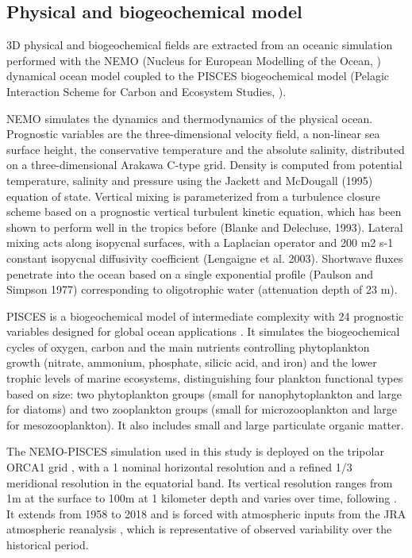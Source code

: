 \subsection{Physical and biogeochemical model}
\label{sec:nemo}

3D physical and biogeochemical fields are extracted from an oceanic simulation performed with the NEMO (Nucleus for European Modelling of the Ocean, \citealp{madecNEMOOceanEngine2019}) dynamical ocean model coupled to the PISCES biogeochemical model (Pelagic Interaction Scheme for Carbon and Ecosystem Studies, \citealp{aumontPISCESv2OceanBiogeochemical2015}). 

NEMO simulates the dynamics and thermodynamics of the physical ocean. Prognostic variables are
the three-dimensional velocity field, a non-linear sea surface height, the
conservative temperature and the absolute salinity, distributed on a three-dimensional Arakawa C-type grid. Density is computed from potential temperature, salinity and pressure using the Jackett and McDougall (1995) equation of state. Vertical mixing is parameterized from a turbulence closure scheme based on a prognostic vertical turbulent kinetic equation, which has been shown to perform well in the tropics before (Blanke and Delecluse, 1993). Lateral mixing acts along isopycnal surfaces, with a Laplacian operator and 200 m2 s-1 constant isopycnal diffusivity coefficient (Lengaigne et al. 2003). Shortwave fluxes penetrate into the ocean based on a single exponential profile (Paulson and Simpson 1977) corresponding to oligotrophic water (attenuation depth of 23 m). 

PISCES is a biogeochemical model of intermediate complexity with 24 prognostic variables designed for global ocean applications \citep{aumontPISCESv2OceanBiogeochemical2015}. It simulates the biogeochemical cycles of oxygen, carbon and the main nutrients controlling phytoplankton growth (nitrate, ammonium, phosphate, silicic acid, and iron) and the lower trophic levels of marine ecosystems, distinguishing four plankton functional types based on size: two phytoplankton groups (small for nanophytoplankton and large for diatoms) and two zooplankton groups (small for microzooplankton and large for mesozooplankton). It also includes small and large particulate organic matter.

The NEMO-PISCES simulation used in this study is deployed on the tripolar ORCA1 grid \citep{madecGlobalOceanMesh1996}, with a 1\degree{} nominal horizontal resolution and a refined 1/3\degree{} meridional resolution in the equatorial band. Its vertical resolution ranges from 1m at the surface to 100m at 1 kilometer depth and varies over time, following \cite{levierFreeSurfaceVariable2007}. It extends from 1958 to 2018 and is forced with atmospheric inputs from the JRA atmospheric reanalysis \citep{kobayashiJRA55ReanalysisGeneral2015}, which is representative of observed variability over the historical period. 


